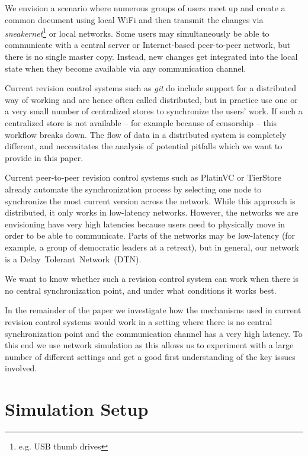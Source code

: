 \documentclass[conference,letterpaper]{IEEEtran}
\begin{document}
We envision a scenario where numerous groups of users meet up and create a common document using local WiFi and then transmit the changes via \textit{sneakernet}\footnote{e.g. USB thumb drives} or local networks. Some users may simultaneously be able to communicate with a central server or Internet-based peer-to-peer network, but there is no single master copy. Instead, new changes get integrated into the local state when they become available via any communication channel.

Current revision control systems such as \textit{git} do include support for a distributed way of working and are hence often called distributed, but in practice use one or a very small number of centralized stores to synchronize the users' work. If such a centralized store is not available -- for example because of censorship -- this workflow breaks down. The flow of data in a distributed system is completely different, and neccesitates the analysis of potential pitfalls which we want to provide in this paper.

Current peer-to-peer revision control systems such as PlatinVC\cite{mukherjee2005fully} or TierStore\cite{demmer2008tierstore} already automate the synchronization process by selecting one node to synchronize the most current version across the network. While this approach is distributed, it only works in low-latency networks. However, the networks we are envisioning have very high latencies because users need to physically move in order to be able to communicate. Parts of the networks may be low-latency (for example, a group of democratic leaders at a retreat), but in general, our network is a Delay~Tolerant~Network~(DTN).

We want to know whether such a revision control system can work when there is no central synchronization point, and under what conditions it works best.

In the remainder of the paper we investigate how the mechanisms used in current revision control systems would work in a setting where there is no central synchronization point and the communication channel has a very high latency. To this end we use network simulation as this allows us to experiment with a large number of different settings and get a good first understanding of the key issues involved.

\section{Simulation Setup}
\end{document}
